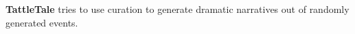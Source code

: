 \label{index_md_extradocs_mainpage}%
%
 {\bfseries{Tattle\+Tale}} tries to use curation to generate dramatic narratives out of randomly generated events. 